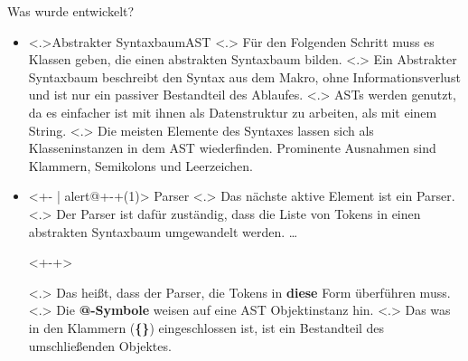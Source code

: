 \begin{frame}{Was wurde entwickelt?}
\begin{itemize}[<+- | alert@+>]
      \item
        \temporal<.>{}{Abstrakter Syntaxbaum}{AST}
            \note[item]<.>{
              Für den Folgenden Schritt muss es Klassen geben, die einen abstrakten Syntaxbaum bilden.
            }
            \note[item]<.>{
              Ein Abstrakter Syntaxbaum beschreibt den Syntax aus dem Makro, ohne Informationsverlust und ist nur ein passiver Bestandteil des Ablaufes.
            }
            \note[item]<.>{
              ASTs werden genutzt, da es einfacher ist mit ihnen als Datenstruktur zu arbeiten, als mit einem String.
            }
            \note[item]<.>{
              Die meisten Elemente des Syntaxes lassen sich als Klasseninstanzen in dem AST wiederfinden. Prominente Ausnahmen sind Klammern, Semikolons und Leerzeichen.
            }
      \item<+- | alert@+-+(1)>
        Parser%
            \note[item]<.>{
              Das nächste aktive Element ist ein Parser.
            }
            \note[item]<.>{
              Der Parser ist dafür zuständig, dass die Liste von Tokens in einen abstrakten Syntaxbaum umgewandelt werden.
              \ldots
            }%
        \begin{uncoverenv}<+-+>%
        \end{uncoverenv}%
            \note[item]<.>{
              Das heißt, dass der Parser, die Tokens in \textbf{diese} Form überführen muss.
            }%
            \note[item]<.>{
              Die \textbf{@-Symbole} weisen auf eine AST Objektinstanz hin.
            }%
            \note[item]<.>{
              Das was in den Klammern (\textbf{\{\}}) eingeschlossen ist, ist ein Bestandteil des umschließenden Objektes.
}
\end{itemize}
\end{frame}
